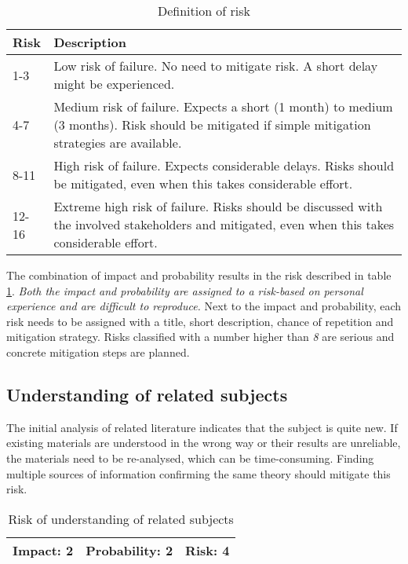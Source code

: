 \begin{table}[!htbp]
\centering
\begin{tabular}{| p{3cm} | p{12cm} |}
\hline
Risk & Description \\
\hline
1-3 & Low risk of failure. No need to mitigate risk. A short delay might be experienced. \\ 
\hline
4-7 & Medium risk of failure. Expects a short (1 month) to medium (3 months). Risk should be mitigated if simple mitigation strategies are available. \\
\hline
8-11 & High risk of failure. Expects considerable delays. Risks should be mitigated, even when this takes considerable effort. \\
\hline
12-16 &	Extreme high risk of failure. Risks should be discussed with the involved stakeholders and mitigated, even when this takes considerable effort. \\
\hline
\end{tabular}
\caption{Definition of risk}
\label{table:dor}
\end{table}

The combination of impact and probability results in the risk described in table \ref{table:dor}. \emph{Both the impact and probability are assigned to a risk-based on personal experience and are difficult to reproduce. } Next to the impact and probability, each risk needs to be assigned with a title, short description, chance of repetition and mitigation strategy.  Risks classified with a number higher than \emph{8} are serious and concrete mitigation steps are planned.

\subsection{Understanding of related subjects} \label{urs}
The initial analysis of related literature indicates that the subject is quite new. If existing materials are understood in the wrong way or their results are unreliable, the materials need to be re-analysed, which can be time-consuming. Finding multiple sources of information confirming the same theory should mitigate this risk. 

\begin{table}[!htbp]
\centering
\begin{tabular}{| p{3cm} | p{3cm} | p{3cm} |}
\hline
Impact: 2 & Probability: 2 & Risk: 4 \\
\hline
\end{tabular}
\caption{Risk of understanding of related subjects}
\label{table:urs}
\end{table}

